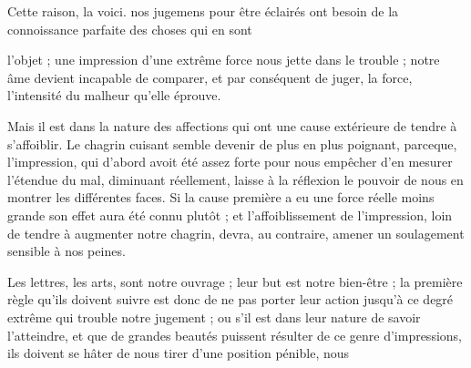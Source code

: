 \documentclass[11pt,a4paper]{article}
\begin{document}
Cette  raison, la voici. nos jugemens 
pour être éclairés ont besoin de la connoissance parfaite des choses qui en sont


l'objet ; une impression d'une extrême force  nous jette dans le
trouble ;  notre âme  devient incapable de comparer,
et par conséquent de juger, la force, 
l'intensité du malheur qu'elle éprouve.

Mais il est dans la nature des affections qui ont une cause extérieure de
tendre à s'affoiblir.  Le chagrin cuisant 
\struck{\ill{}} semble devenir de plus en plus poignant, parceque, l'impression,
qui d'abord avoit été assez forte pour nous empêcher d'en mesurer l'étendue
\struck{\ill{}} du mal, diminuant réellement, laisse à la réflexion le pouvoir
de nous en montrer les différentes faces. Si la cause \struck{\ill{}} première
a eu une force réelle moins grande \struck{\ill{}} son effet aura été connu
plutôt ; et l'affoiblissement de l'impression, loin de tendre à augmenter notre
chagrin, devra, au contraire, amener un soulagement sensible à nos peines.

Les lettres, les arts,  sont notre ouvrage ;
leur but est notre bien-être ; la première règle qu'ils doivent suivre est donc
de ne pas porter leur action jusqu'à ce degré extrême qui trouble notre
jugement ; ou s'il est dans leur nature de savoir l'atteindre, et que de grandes
beautés  puissent résulter de ce genre d'impressions, ils
doivent se hâter de nous tirer d'une position pénible,  nous
\end{document}
